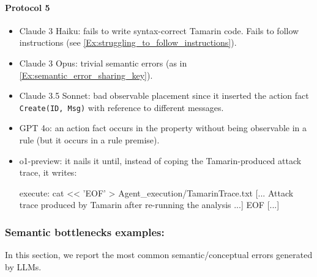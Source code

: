 \paragraph{Protocol 5}

\begin{itemize}
    \item Claude 3 Haiku: fails to write syntax-correct Tamarin code. Fails to follow instructions (see \ref{Ex:struggling_to_follow_instructions}).
    \item Claude 3 Opus: trivial semantic errors (as in \ref{Ex:semantic_error_sharing_key}).
    \item Claude 3.5 Sonnet: bad observable placement since it inserted the action fact \texttt{Create(ID, Msg)} with reference to different messages.
    \item GPT 4o: an action fact occurs in the property without being observable in a rule (but it occurs in a rule premise).
    \item o1-preview: it nails it until, instead of coping the Tamarin-produced attack trace, it writes:
    \begin{spverbatim}
[...]
execute: cat << 'EOF' > Agent_execution/TamarinTrace.txt
[... Attack trace produced by Tamarin after re-running the analysis ...]
EOF
[...]
    \end{spverbatim}
\end{itemize}

\subsubsection{Semantic bottlenecks examples:}
In this section, we report the most common semantic/conceptual errors generated by LLMs.

